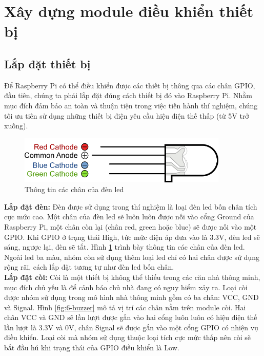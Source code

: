 \documentclass[12pt,a4paper,oneside]{extbook}
\begin{document}
\section{Xây dựng module điều khiển thiết bị}\label{device-controller-implementation}
\subsection{Lắp đặt thiết bị}
Để Raspberry Pi có thể điều khiển được các thiết bị thông qua các chân GPIO, đầu tiên, chúng ta phải lắp đặt đúng cách thiết bị đó vào Raspberry Pi. Nhằm mục đích đảm bảo an toàn và thuận tiện trong việc tiến hành thí nghiệm, chúng tôi ưu tiên sử dụng những thiết bị điện yêu cầu hiệu điện thế thấp (từ 5V trở xuống).

\begin{figure}[h]
  \centering
     \includegraphics[width=10cm]{6-rgb-led}
  \caption{Thông tin các chân của đèn led}\label{fig:6-rgb-led}
\end{figure}

\noindent
\textbf{Lắp đặt đèn:} Đèn được sử dụng trong thí nghiệm là loại đèn led bốn chân tích cực mức cao. Một chân của đèn led sẽ luôn luôn được nối vào cổng Ground của Raspberry Pi, một chân còn lại (chân red, green hoặc blue) sẽ được nối vào một GPIO. Khi GPIO ở trạng thái High, tức mức điện áp đưa vào là 3.3V, đèn led sẽ sáng, ngược lại, đèn sẽ tắt. Hình \ref{fig:6-rgb-led} trình bày thông tin các chân của đèn led. Ngoài led ba màu, nhóm còn sử dụng thêm loại led chỉ có hai chân được sử dụng rộng rãi, cách lắp đặt tương tự như đèn led bốn chân.\\

\noindent
\textbf{Lắp đặt còi:} Còi là một thiết bị không thể thiếu trong các căn nhà thông minh, mục đích chủ yếu là để cảnh báo chủ nhà đang có nguy hiểm xảy ra. Loại còi được nhóm sử dụng trong mô hình nhà thông minh gồm có ba chân: VCC, GND và Signal. Hình \ref{fig:6-buzzer} mô tả vị trí các chân nằm trên module còi. Hai chân VCC và GND sẽ lần lượt được gắn vào hai cổng luôn luôn có hiệu điện thế lần lượt là 3.3V và 0V, chân Signal sẽ được gắn vào một cổng GPIO có nhiện vụ điều khiển. Loại còi mà nhóm sử dụng thuộc loại tích cực mức thấp nên còi sẽ bắt đầu hú khi trạng thái của GPIO điều khiển là Low.
\end{document}
